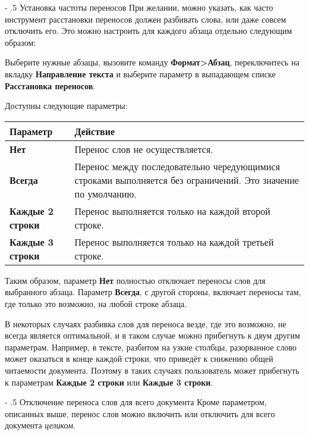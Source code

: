 ﻿\documentclass[a4paper,10pt]{article}
\makeatletter
\renewcommand\paragraph{%
   \@startsection{paragraph}{4}{0mm}%
      {-\baselineskip}%
      {.5\baselineskip}%
      {\normalfont\normalsize\bfseries}}
\makeatother
\begin{document}
\paragraph{Установка частоты переносов}
При желании, можно указать, как часто инструмент расстановки переносов должен разбивать слова, или даже совсем отключить его. Это можно настроить для каждого абзаца отдельно следующим образом:

Выберите нужные абзацы, вызовите команду \textbf{Формат>Абзац}, переключитесь на вкладку \textbf{Направление текста} и выберите параметр в выпадающем списке \textbf{Расстановка переносов}.

Доступны следующие параметры:

\begin{center}
\begin{tabular}{  m{4cm}  m{12cm}  }
 \textbf{Параметр} & \textbf{Действие}\\ 
 \hline
  \textbf{Нет} & Перенос слов не осуществляется.\\
  \textbf{Всегда} & Перенос между последовательно чередующимися строками выполняется без ограничений. Это значение по умолчанию.\\ 
\textbf{Каждые 2 строки} & Перенос выполняется только на каждой второй строке.\\
\textbf{Каждые 3 строки} & Перенос выполняется только на каждой третьей строке.\\
\end{tabular}
\end{center}

Таким образом, параметр \textbf{Нет} полностью отключает переносы слов для выбранного абзаца. Параметр \textbf{Всегда}, с другой стороны, включает переносы там, где только это возможно, на любой строке абзаца.

В некоторых случаях разбивка слов для переноса везде, где это возможно, не всегда является оптимальной, и в таком случае можно прибегнуть к двум другим параметрам. Например, в тексте, разбитом на узкие столбцы, разорванное слово может оказаться в конце каждой строки, что приведёт к снижению общей читаемости документа. Поэтому в таких случаях пользователь может прибегнуть к параметрам \textbf{Каждые 2 строки} или \textbf{Каждые 3 строки}.

\paragraph{Отключение переноса слов для всего документа}
Кроме параметром, описанных выше, перенос слов можно включить или отключить для всего документа \textit{целиком}.
\end{document}
